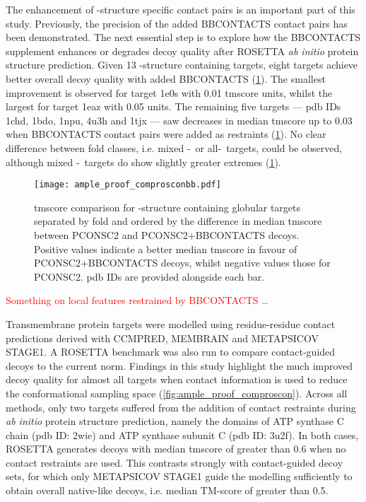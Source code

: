 The enhancement of \textbeta-structure specific contact pairs is an important part of this study. Previously, the precision of the added BBCONTACTS contact pairs has been demonstrated. The next essential step is to explore how the BBCONTACTS supplement enhances or degrades decoy quality after ROSETTA \textit{ab initio} protein structure prediction. Given 13 \textbeta-structure containing targets, eight targets achieve better overall decoy quality with added BBCONTACTS (\cref{fig:ample_proof_comprosconbb}). The smallest improvement is observed for target 1e0s with 0.01 \gls{tmscore} units, whilst the largest for target 1eaz with 0.05 units. The remaining five targets --- \gls{pdb} IDs 1chd, 1bdo, 1npu, 4u3h and 1tjx --- saw decreases in median \gls{tmscore} up to 0.03 when BBCONTACTS contact pairs were added as restraints (\cref{fig:ample_proof_comprosconbb}). No clear difference between fold classes, i.e. mixed \textalpha-\textbeta\ or all-\textbeta\ targets, could be observed, although mixed \textalpha-\textbeta\ targets do show slightly greater extremes (\cref{fig:ample_proof_comprosconbb}).

\begin{figure}[H]
    \centering
    \texttt{[image: ample\_proof\_comprosconbb.pdf]}
    \caption[TM-score comparison for \textbeta-richt targets]{\gls{tmscore} comparison for \textbeta-structure containing globular targets separated by fold and ordered by the difference in median \gls{tmscore} between PCONSC2 and PCONSC2+BBCONTACTS decoys. Positive values indicate a better median \gls{tmscore} in favour of PCONSC2+BBCONTACTS decoys, whilst negative values those for PCONSC2. \Gls{pdb} IDs are provided alongside each bar.}
    \label{fig:ample_proof_comprosconbb}
\end{figure}

\textcolor{red}{Something on local features restrained by BBCONTACTS \ldots}

Transmembrane protein targets were modelled using residue-residue contact predictions derived with CCMPRED, MEMBRAIN and METAPSICOV STAGE1. A ROSETTA benchmark was also run to compare contact-guided decoys to the current norm. Findings in this study highlight the much improved decoy quality for almost all targets when contact information is used to reduce the conformational sampling space (\cref{fig:ample_proof_comproscon}). Across all methods, only two targets suffered from the addition of contact restraints during \textit{ab initio} protein structure prediction, namely the domains of ATP synthase C chain (\gls{pdb} ID: 2wie) and ATP synthase subunit C (\gls{pdb} ID: 3u2f). In both cases, ROSETTA generates decoys with median \gls{tmscore} of greater than 0.6 when no contact restraints are used. This contrasts strongly with contact-guided decoy sets, for which only METAPSICOV STAGE1 guide the modelling sufficiently to obtain overall native-like decoys, i.e. median TM-score of greater than 0.5. 

